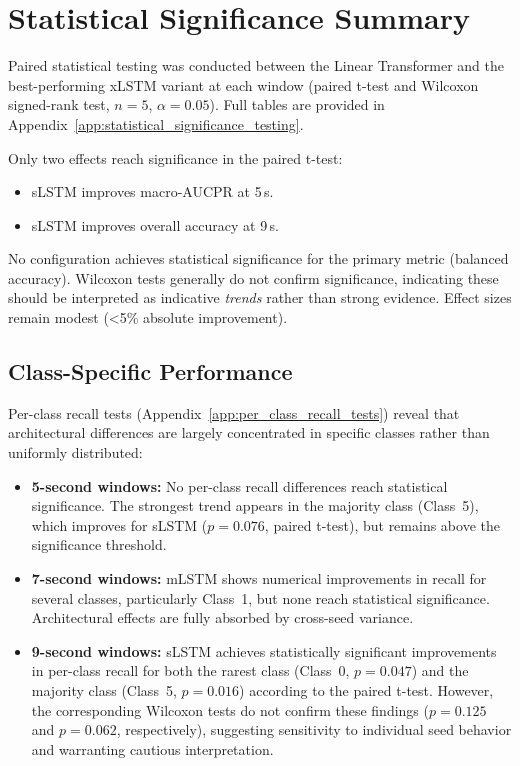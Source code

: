 \section{Statistical Significance Summary}
\label{sec:results_statistical_significance_summary}

Paired statistical testing was conducted between the Linear Transformer and the
best-performing \ac{xLSTM} variant at each window (paired t-test and Wilcoxon
signed-rank test, \(n=5\), \(\alpha = 0.05\)). Full tables are provided in
Appendix~\ref{app:statistical_significance_testing}.

Only two effects reach significance in the paired t-test:
\begin{itemize}
\item \ac{sLSTM} improves macro-\ac{AUCPR} at 5\,s.
\item \ac{sLSTM} improves overall accuracy at 9\,s.
\end{itemize}

No configuration achieves statistical significance for the primary metric
(balanced accuracy). Wilcoxon tests generally do not confirm significance,
indicating these should be interpreted as indicative \emph{trends} rather than
strong evidence. Effect sizes remain modest (<5\% absolute improvement).

\subsection{Class-Specific Performance}

Per-class recall tests (Appendix~\ref{app:per_class_recall_tests}) reveal that
architectural differences are largely concentrated in specific classes rather
than uniformly distributed:

\begin{itemize}
\item \textbf{5-second windows:} No per-class recall differences reach
statistical significance. The strongest trend appears in the majority class
(Class~5), which improves for \ac{sLSTM} (\(p=0.076\), paired t-test), but
remains above the significance threshold.

\item \textbf{7-second windows:} \ac{mLSTM} shows numerical improvements in
recall for several classes, particularly Class~1, but none reach statistical
significance. Architectural effects are fully absorbed by cross-seed variance.

\item \textbf{9-second windows:} \ac{sLSTM} achieves statistically significant
improvements in per-class recall for both the rarest class (Class~0,
\(p=0.047\)) and the majority class (Class~5, \(p=0.016\)) according to the
paired t-test. However, the corresponding Wilcoxon tests do not confirm these
findings (\(p=0.125\) and \(p=0.062\), respectively), suggesting sensitivity to
individual seed behavior and warranting cautious interpretation.
\end{itemize}

